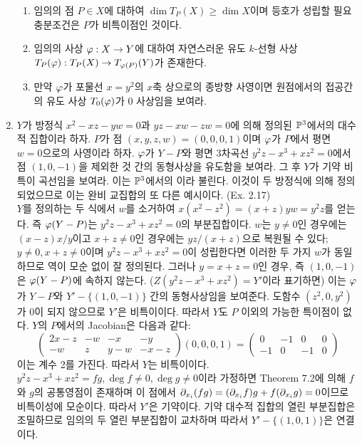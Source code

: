 \begin{enumerate}[label=\tb{5.\arabic*.},itemindent=0mm,itemsep=4mm]
\begin{enumerate}[label=(\alph*)]
	\item 임의의 점 $P\in X$에 대하여 $\dim T_P(X)\ge\dim X$이며 등호가 성립할 필요충분조건은 $P$가 비특이점인 것이다.
	\item 임의의 사상 $\varphi:X\rightarrow Y$에 대하여 자연스러운 유도 $k$-선형 사상 $T_P(\varphi):T_P(X)\rightarrow T_{\varphi(P)}(Y)$가 존재한다.
	\item 만약 $\varphi$가 포물선 $x=y^2$의 $x$축 상으로의 종방향 사영이면 원점에서의 접공간의 유도 사상 $T_0(\varphi)$가 0 사상임을 보여라.
	\end{enumerate}
	\item {} $Y$가 방정식 $x^2-xz-yw=0$과 $yz-xw-zw=0$에 의해 정의된
	$\mathbb{P}^3$에서의 대수적 집합이라 하자. $P$가 점 $(x,y,z,w)=(0,0,0,1)$이며 $\varphi$가 $P$에서 평면 $w=0$으로의 사영이라 하자.
	$\varphi$가 $Y-P$와 평면 3차곡선 $y^2z-x^3+xz^2=0$에서 점 $(1,0,-1)$을 제외한 것 간의 동형사상을 유도함을 보여라.
	그 후 $Y$가 기약 비특이 곡선임을 보여라. 이는 $\mathbb{P}^3$에서의 이라 불린다.
	이것이 두 방정식에 의해 정의되었으므로 이는 완비 교집합의 또 다른 예시이다. (Ex. 2.17)\\
	\sol $Y$를 정의하는 두 식에서 $w$를 소거하여 $x(x^2-z^2)=(x+z)yw=y^2z$를 얻는다.
	즉 $\varphi(Y-P)$는 $y^2z-x^3+xz^2=0$의 부분집합이다.
	$w$는 $y\ne 0$인 경우에는 $(x-z)x/y$이고 $x+z\ne 0$인 경우에는 $yz/(x+z)$으로 복원될 수 있다;
	$y\ne 0,x+z\ne 0$이며 $y^2z-x^3+xz^2=0$이 성립한다면 이러한 두 가지 $w$가 동일하므로 역이 모순 없이 잘 정의된다.
	그러나 $y=x+z=0$인 경우, 즉 $(1,0,-1)$은 $\varphi(Y-P)$에 속하지 않는다.
	($Z(y^2z-x^3+xz^2)=Y'$이라 표기하면) 이는 $\varphi$가 $Y-P$와 $Y'-\{(1,0,-1)\}$ 간의 동형사상임을 보여준다.
	도함수 $(z^2,0,y^2)$가 0이 되지 않으므로 $Y'$은 비특이이다. 따라서 $Y$도 $P$ 이외의 가능한 특이점이 없다.
	$Y$의 $P$에서의 Jacobian은 다음과 같다:
	$$\left(\begin{array}{cccc}2x-z&-w&-x&-y\\-w&z&y-w&-x-z\end{array}\right)(0,0,0,1)
	=\left(\begin{array}{cccc}0&-1&0&0\\-1&0&-1&0\end{array}\right)$$
	이는 계수 2를 가진다. 따라서 $Y$는 비특이이다.\\
	$y^2z-x^3+xz^2=fg,\deg f\ne 0,\deg g\ne 0$이라 가정하면 Theorem 7.2에 의해 $f$와 $g$의 공통영점이 존재하며
	이 점에서 $\partial_{x_i}(fg)=(\partial_{x_i}f)g+f(\partial_{x_i}g)=0$이므로 비특이성에 모순이다. 따라서 $Y'$은 기약이다.
	기약 대수적 집합의 열린 부분집합은 조밀하므로 임의의 두 열린 부분집합이 교차하며 따라서 $Y'-\{(1,0,1)\}$은 연결이다.

\end{enumerate}
